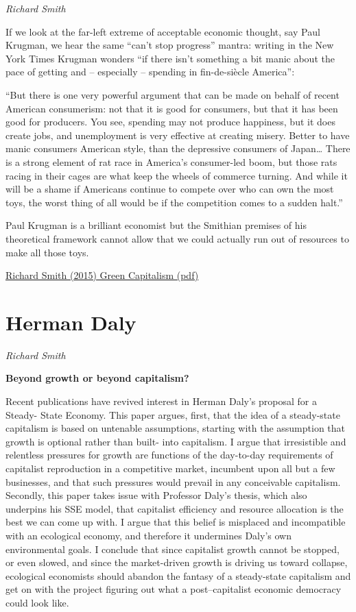 \documentclass[
]{book}
\begin{document}
\emph{Richard Smith}

If we look at the far-left extreme of acceptable economic
thought, say Paul Krugman, we hear the same ``can't stop progress'' mantra: writing
in the New York Times Krugman wonders ``if there isn't something a bit manic about
the pace of getting and -- especially -- spending in fin-de-siècle America'':

``But there is one very powerful argument that can be made on
behalf of recent American consumerism: not that it is good for
consumers, but that it has been good for producers. You see,
spending may not produce happiness, but it does create jobs, and
unemployment is very effective at creating misery. Better to have
manic consumers American style, than the depressive consumers
of Japan\ldots{} There is a strong element of rat race in America's
consumer-led boom, but those rats racing in their cages are what
keep the wheels of commerce turning. And while it will be a
shame if Americans continue to compete over who can own the
most toys, the worst thing of all would be if the competition comes
to a sudden halt.''

Paul Krugman is a brilliant economist but the Smithian premises of his theoretical
framework cannot allow that we could actually run out of resources to make all
those toys.

\href{pdf/Richard_Smith_Green_Capitalism_the_God_that_Failed.pdf}{Richard Smith (2015) Green Capitalism (pdf)}

\hypertarget{herman-daly-1}{%
\section{Herman Daly}\label{herman-daly-1}}

\emph{Richard Smith}

\textbf{Beyond growth or beyond capitalism?}

Recent publications have revived interest in Herman
Daly's proposal for a Steady- State Economy. This paper argues,
first, that the idea of a steady-state capitalism is based on
untenable assumptions, starting with the assumption that growth is
optional rather than built- into capitalism. I argue that irresistible
and relentless pressures for growth are functions of the day-to-day
requirements of capitalist reproduction in a competitive market,
incumbent upon all but a few businesses, and that such pressures
would prevail in any conceivable capitalism. Secondly, this paper
takes issue with Professor Daly's thesis, which also underpins his
SSE model, that capitalist efficiency and resource allocation is the
best we can come up with. I argue that this belief is misplaced and
incompatible with an ecological economy, and therefore it
undermines Daly's own environmental goals. I conclude that since
capitalist growth cannot be stopped, or even slowed, and since the
market-driven growth is driving us toward collapse, ecological
economists should abandon the fantasy of a steady-state capitalism
and get on with the project figuring out what a post--capitalist
economic democracy could look like.
\end{document}
